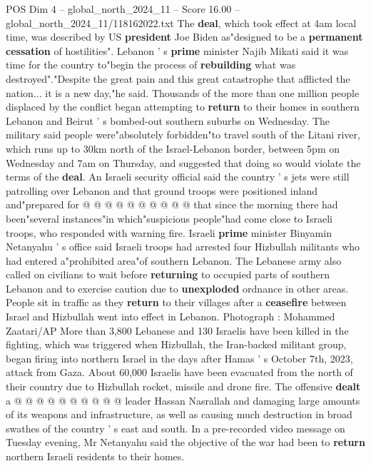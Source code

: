 \begin{textsample}{POS Dim 4 – global\_north\_2024\_11 – Score 16.00 – global\_north\_2024\_11/118162022.txt}  \label{ex:f4_pos_300}
The \textbf{deal}, which took effect at 4am local time, was described by US \textbf{president} Joe Biden as"designed to be a \textbf{permanent} \textbf{cessation} of hostilities".
Lebanon ' s \textbf{prime} minister Najib Mikati said it was time for the country to"begin the process of \textbf{rebuilding} what was destroyed"."Despite the great pain and this great catastrophe that afflicted the nation... it is a new day,"he said.
Thousands of the more than one million people displaced by the conflict began attempting to \textbf{return} to their homes in southern Lebanon and Beirut ' s bombed-out southern suburbs on Wednesday.
The military said people were"absolutely forbidden"to travel south of the Litani river, which runs up to 30km north of the Israel-Lebanon border, between 5pm on Wednesday and 7am on Thursday, and suggested that doing so would violate the terms of the \textbf{deal}.
An Israeli security official said the country ' s jets were still patrolling over Lebanon and that ground troops were positioned inland and"prepared for @ @ @ @ @ @ @ @ @ @ that since the morning there had been"several instances"in which"suspicious people"had come close to Israeli troops, who responded with warning fire.
Israeli \textbf{prime} minister Binyamin Netanyahu ' s office said Israeli troops had arrested four Hizbullah militants who had entered a"prohibited area"of southern Lebanon.
The Lebanese army also called on civilians to wait before \textbf{returning} to occupied parts of southern Lebanon and to exercise caution due to \textbf{unexploded} ordnance in other areas.
People sit in traffic as they \textbf{return} to their villages after a \textbf{ceasefire} between Israel and Hizbullah went into effect in Lebanon.
Photograph : Mohammed Zaatari/AP More than 3,800 Lebanese and 130 Israelis have been killed in the fighting, which was triggered when Hizbullah, the Iran-backed militant group, began firing into northern Israel in the days after Hamas ' s October 7th, 2023, attack from Gaza.
About 60,000 Israelis have been evacuated from the north of their country due to Hizbullah rocket, missile and drone fire.
The offensive \textbf{dealt} a @ @ @ @ @ @ @ @ @ @ leader Hassan Nasrallah and damaging large amounts of its weapons and infrastructure, as well as causing much destruction in broad swathes of the country ' s east and south.
In a pre-recorded video message on Tuesday evening, Mr Netanyahu said the objective of the war had been to \textbf{return} northern Israeli residents to their homes.

\end{textsample}
